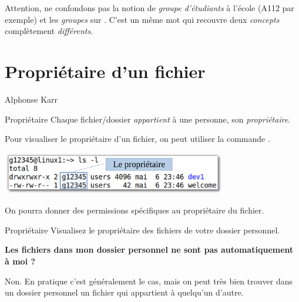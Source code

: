 \documentclass[a4paper,11pt]{style-esi/td}
\begin{document}
		\medskip
		\begin{alertbox}
			Attention, ne confondons pas
			la notion de \emph{groupe d'étudiants} à l'école (A112 par exemple)
			et les \emph{groupes} sur .
			C'est un même mot qui recouvre deux 
			\emph{concepts} complètement \emph{différents}.
		\end{alertbox}

	\section{Propriétaire d'un fichier}
	
			{Alphonse Karr}
		\vspace{2em}

		\vspace{1em}

		\begin{theorie}{Propriétaire}
			Chaque fichier/dossier \emph{appartient} à une personne, 
			son \emph{propriétaire}.
		\end{theorie}

		Pour visualiser le propriétaire d'un fichier, 
		on peut utiliser la commande .

		\begin{center}
			\includegraphics[height=5em]{image/owner}
		\end{center}

		On pourra donner des permissions spécifiques au propriétaire du fichier.

		\begin{Exercice}{Propriétaire}
			Visualisez le propriétaire des fichiers de votre dossier personnel.
		\end{Exercice}

		\begin{faq}
			\textbf{Les fichiers dans mon dossier personnel ne sont pas 
			automatiquement à moi ?}

			Non. En pratique c'est généralement le cas, 
			mais on peut très bien trouver dans un dossier personnel 
			un fichier qui appartient à quelqu'un d'autre.  
		\end{faq}
\end{document}

